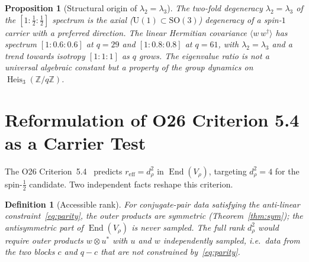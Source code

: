 \documentclass[12pt,a4paper]{article}
\newtheorem{proposition}[theorem]{Proposition}
\newtheorem{definition}[theorem]{Definition}
\theoremstyle{remark}
\DeclareMathOperator{\End}{End}
\DeclareMathOperator{\Heis}{Heis}
\newcommand{\Vrho}{V_{\rho}}
\newcommand{\reff}{r_{\mathrm{eff}}}
\begin{document}
    \begin{proposition}[Structural origin of $\lambda_2 = \lambda_3$]
      \label{prop:eigvals}
      The two-fold degeneracy $\lambda_2 = \lambda_3$ of the $[1 : \tfrac{1}{2} : \tfrac{1}{2}]$ spectrum is the axial
      ($\mathrm{U}(1) \subset \mathrm{SO}(3)$) degeneracy of a spin-$1$ carrier with a preferred direction.
      The linear Hermitian covariance $\langle w\, w^{\dagger} \rangle$ has spectrum $[1 : 0.6 : 0.6]$ at $q = 29$ and
      $[1 : 0.8 : 0.8]$ at $q = 61$, with $\lambda_2 = \lambda_3$ and a trend towards isotropy $[1:1:1]$ as $q$ grows.
      The eigenvalue ratio is not a universal algebraic constant but a property of the group dynamics on
      $\Heis_3(\mathbb{Z}/q\mathbb{Z})$.
    \end{proposition}

  \section{Reformulation of O26 Criterion 5.4 as a Carrier Test}
    \label{sec:reformulation}

    The O26 Criterion~5.4~\cite{Beau2026a30} predicts $\reff = d_{\rho}^2$ in $\End(\Vrho)$, targeting
    $d_{\rho}^2 = 4$ for the spin-$\tfrac{1}{2}$ candidate.
    Two independent facts reshape this criterion.

    \begin{definition}[Accessible rank]
      \label{def:accessible}
      For conjugate-pair data satisfying the anti-linear constraint~\eqref{eq:parity}, the outer products are symmetric
      (Theorem~\ref{thm:sym}); the antisymmetric part of $\End(\Vrho)$ is never sampled.
      The \emph{full rank} $d_{\rho}^2$ would require outer products $w \otimes u^{*}$ with $u$ and $w$ independently
      sampled, i.e.\ data from the two blocks $c$ and $q{-}c$ that are not constrained by~\eqref{eq:parity}.
    \end{definition}
\end{document}
